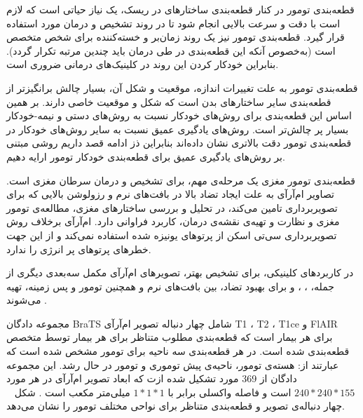 



قطعه‌بندی تومور در کنار قطعه‌بندی ساختارهای در ریسک، یک نیاز حیاتی است که لازم است با دقت و سرعت بالایی انجام شود تا در روند تشخیص و درمان مورد استفاده قرار گیرد. قطعه‌بندی تومور نیز یک روند زمان‌بر و خسته‌کننده برای شخص متخصص است (به‌خصوص آنکه این قطعه‌بندی در طی درمان باید چندین مرتبه تکرار گردد). بنابراین خودکار کردن این روند در کلینیک‌های درمانی ضروری است. 

قطعه‌بندی تومور به علت تغییرات اندازه، موقعیت و شکل آن، بسیار چالش‌ برانگیزتر از قطعه‌بندی سایر ساختارهای بدن است که شکل و موقعیت خاصی دارند. بر همین اساس این قطعه‌بندی برای روش‌های خودکار نسبت به روش‌های دستی و نیمه-خودکار بسیار پر چالش‌تر است. روش‌های یادگیری عمیق نسبت به سایر روش‌های  خودکار در قطعه‌بندی تومور دقت بالاتری نشان‌ داده‌اند بنابراین  ذز ادامه قصد داریم روشی مبتنی بر روش‌های یادگیری عمیق برای قطعه‌بندی خودکار تومور ارایه دهیم.


قطعه‌بندی تومور مغزی یک مرحله‌ی مهم، برای تشخیص و درمان سرطان مغزی است. تصاویر ام‌آرآی به علت ایجاد تضاد بالا در بافت‌های نرم و رزولوشن‌ بالایی که برای تصویربرداری تامین می‌کند، در تحلیل و بررسی ساختارهای مغزی، مطالعه‌ی تومور مغزی و نظارت و تهیه‌ی نقشه‌ی درمان، کاربرد فراوانی دارد. ام‌آرآی برخلاف روش تصویربرداری سی‌تی اسکن از پرتوهای یونیزه شده استفاده نمی‌کند و از این جهت خطرهای پرتوهای پر انرژی را ندارد. 

در کاربردهای کلینیکی، برای تشخیص بهتر، تصویر‌های ام‌آرآی مکمل سه‌بعدی دیگری از جمله،  ، ، و  برای بهبود تضاد، بین بافت‌های نرم و همچنین تومور و پس زمینه، تهیه می‌شوند .

مجموعه دادگان BraTS  شامل چهار دنباله تصویر ام‌آرآی T1 ، T2 ، T1ce و FlAIR برای هر بیمار است که قطعه‌بندی مطلوب متناظر برای هر بیمار توسط متخصص قطعه‌بندی شده است. در هر قطعه‌بندی سه ناحیه برای تومور مشخص شده است که عبارتند از: هسته‌ی تومور، ناحیه‌ی پیش‌ توموری و تومور در حال رشد. این مجموعه دادگان از 369 مورد تشکیل شده ازت که ابعاد تصویر ام‌آرآی در هر مورد $240*240*155$ است و فاصله واکسلی برابر با $1*1*1$ میلی‌متر مکعب است . شکل ~ چهار دنباله‌ی تصویر و قطعه‌بندی متناظر برای نواحی مختلف تومور را نشان می‌دهد.

